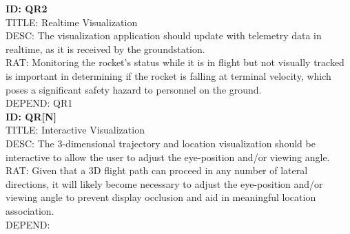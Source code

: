 \documentclass[onecolumn, draftclsnofoot,10pt, compsoc]{IEEEtran}
\begin{document}
			\noindent
			\textbf{ID: QR2}\\
			TITLE: Realtime Visualization\\
			DESC: The visualization application should update with telemetry data in realtime, as it is received by the groundstation.\\
			RAT: Monitoring the rocket's status while it is in flight but not visually tracked is important in determining if the rocket is falling at terminal velocity, which poses a significant safety hazard to personnel on the ground. \\
			DEPEND: QR1\\
			
			\noindent
			\textbf{ID: QR[N]}\\
			TITLE: Interactive Visualization\\
			DESC: The 3-dimensional trajectory and location visualization should be interactive to allow the user to adjust the eye-position and/or viewing angle.\\
			RAT: Given that a 3D flight path can proceed in any number of lateral directions, it will likely become necessary to adjust the eye-position and/or viewing angle to prevent display occlusion and aid in meaningful location association.\\
			DEPEND: \\

\end{document}
